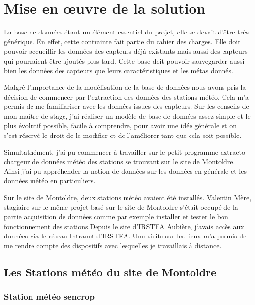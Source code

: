 \section{Mise en œuvre de la solution} 

La base de données étant un élément essentiel du projet, elle se devait d’être très générique. En effet, cette contrainte fait partie du cahier des charges. Elle doit pouvoir accueillir les données des capteurs déjà existants mais aussi des capteurs qui pourraient être ajoutés plus tard. Cette base doit pouvoir sauvegarder aussi bien les données des capteurs que leurs caractéristiques et les métas donnés.

Malgré l'importance de la modélisation de la base de données nous avons pris la décision de commencer par l'extraction des données des stations météo. Cela m'a permis de me familiariser avec les données issues des capteurs. Sur les conseils de mon maître de stage, j'ai réaliser un modèle de base de données assez simple et le plus évolutif possible, facile à comprendre, pour avoir une idée générale et on s’est réservé le droit de le modifier et de l’améliorer tant que cela soit possible. 

Simultatnément, j’ai pu commencer à travailler sur le petit programme extracto-chargeur de données météo des stations se trouvant sur le site de Montoldre. Ainsi j’ai pu appréhender la notion de données sur les données en générale et les données météo en particuliers.  

 
Sur le site de Montoldre, deux stations météo avaient été installés. Valentin Mère, stagiaire sur le même projet basé sur le site de Montoldre s’était occupé de la partie acquisition de données comme par exemple installer et tester le bon fonctionnement des stations.Depuis le site d’IRSTEA Aubière, j‘avais accès aux données via le réseau Intranet d’IRSTEA. Une visite sur les lieux m’a permis de me rendre compte des dispositifs avec lesquelles je travaillais à distance.  

\subsection{Les Stations météo du site de Montoldre} 

\subsubsection{Station météo sencrop}

